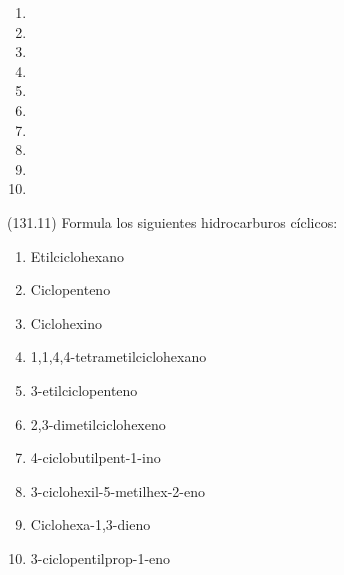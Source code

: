 \documentclass[10pt,a5paper,twoside]{article}
\begin{document}
  \begin{solution}
    \begin{enumerate}
      \item {}
      \item {}
      \item {}
      \item {}
      \item {}
      \item {}
      \item {}
      \item {}
      \item {}
      \item {}
    \end{enumerate}
  \end{solution}




  \begin{exercise}[
      tags    = {},
      topics  = {química, química orgánica, orgánica},
      source  = {FQ 1B MGH 2016, p131, e11},
    ]
    (131.11) Formula los siguientes hidrocarburos cíclicos:
    \begin{enumerate}
      \item Etilciclohexano
      \item Ciclopenteno
      \item Ciclohexino
      \item 1,1,4,4-tetrametilciclohexano
      \item 3-etilciclopenteno
      \item 2,3-dimetilciclohexeno
      \item 4-ciclobutilpent-1-ino
      \item 3-ciclohexil-5-metilhex-2-eno
      \item Ciclohexa-1,3-dieno
      \item 3-ciclopentilprop-1-eno
    \end{enumerate}
  \end{exercise}
\end{document}
